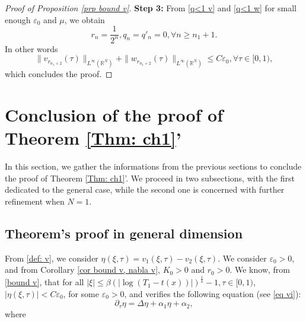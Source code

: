 \documentclass[11pt,a4paper]{article}
\newcommand{\1}{\mathbbm{1}}
\numberwithin{equation}{section}
\newcommand{\numberset}{\mathbb}
\newcommand{\R}{\numberset{R}}
\theoremstyle{remark}
\begin{document}
\begin{proof}[Proof of Proposition \ref{prp bound v}]
\textbf{Step 3:} From \eqref{q<1 v} and \eqref{q<1 w} for small enough $\varepsilon_0$ and $\mu$, we obtain
$$r_n=\frac{1}{2^{n}}, q_n=q'_n=0, \forall n\geq n_1+1.$$ 
In other words
\begin{equation}\label{conlusion n1}
\|v_{r_{n_1+2}}(\tau)\|_{L^\infty(\R^N)}+\|w_{r_{n_1+2}}(\tau)\|_{L^\infty(\R^N)}\leq C\varepsilon_0, \forall \tau \in [0,1),
\end{equation}
which concludes the proof.
\end{proof}




\section{Conclusion of the proof of Theorem \ref{Thm: ch1}'}\label{Conclusion Thm 2}
In this section, we gather the informations from the previous sections to conclude the proof of Theorem \ref{Thm: ch1}'. We proceed in two subsections, with the first dedicated to the general case, while the second one is concerned with further refinement when $N=1$.
\subsection{Theorem's proof in general dimension}
From \eqref{def: v}, we consider $\eta(\xi,\tau)=v_1(\xi,\tau)-v_2(\xi,\tau)$. We consider $\varepsilon_0>0$, and from Corollary \ref{cor bound v, nabla v}, $K_0>0$ and $r_0>0$. We know, from \eqref{bound v}, that for all $|\xi|\leq\beta (|\log(T_1-t(x))|)^{\frac{1}{4}}-1,\tau \in [0,1)$, $|\eta(\xi,\tau)|<C\varepsilon_0$, for some $\varepsilon_0>0$, and verifies the following equation (see \eqref{eq vi}):
\begin{equation}\label{eq eta}
\partial_\tau \eta=\Delta \eta+\alpha_1 \eta+\alpha_2,
\end{equation}
where 
\end{document}
